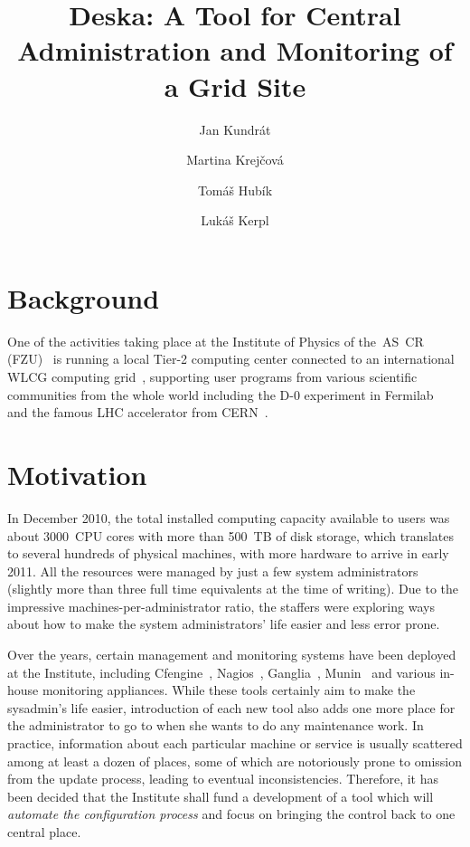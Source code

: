 \documentclass{article}
\begin{document}
\title{Deska: A Tool for Central Administration and Monitoring of a Grid Site}

\author{Jan Kundrát \and Martina Krejčová \and Tomáš Hubík \and Lukáš Kerpl}

\maketitle

\section{Background}

One of the activities taking place at the Institute of Physics of the~AS~CR (FZU)~\cite{fzu} is running a local Tier-2 computing
center connected to an international WLCG computing grid~\cite{wlcg}, supporting user programs from various scientific communities
from the whole world including the D-0 experiment in Fermilab~\cite{d0} and the famous LHC accelerator from CERN~\cite{lhc}.

\section{Motivation}

In December 2010, the total installed computing capacity available to users was about 3000~CPU cores with more than 500~TB of disk
storage, which translates to several hundreds of physical machines, with more hardware to arrive in early 2011.  All the resources
were managed by just a few system administrators (slightly more than three full time equivalents at the time of writing).  Due to
the impressive machines-per-administrator ratio, the staffers were exploring ways about how to make the system administrators'
life easier and less error prone.

Over the years, certain management and monitoring systems have been deployed at the Institute, including Cfengine~\cite{cfengine},
Nagios~\cite{nagios}, Ganglia~\cite{ganglia}, Munin~\cite{munin} and various in-house monitoring appliances.  While these tools
certainly aim to make the sysadmin's life easier, introduction of each new tool also adds one more place for the administrator to
go to when she wants to do any maintenance work.  In practice, information about each particular machine or service is usually
scattered among at least a dozen of places, some of which are notoriously prone to omission from the update process, leading to
eventual inconsistencies.  Therefore, it has been decided that the Institute shall fund a development of a tool which will {\em
automate the configuration process} and focus on bringing the control back to one central place.
\end{document}
